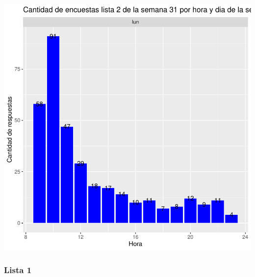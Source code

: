 \documentclass{article}
\begin{document}
\includegraphics{seguimientov5-020}

\subsubsection{Lista 1}
\end{document}
